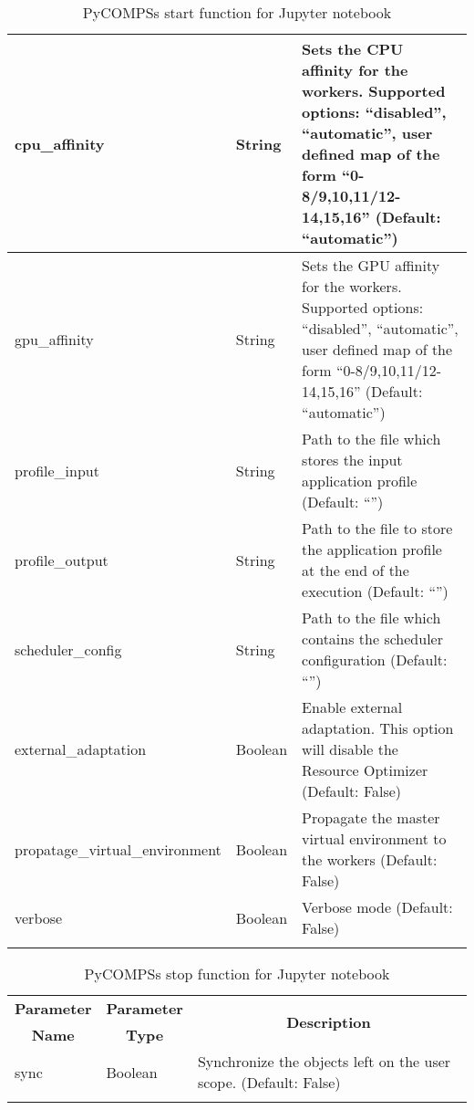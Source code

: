 \begin{longtable}{| p{} | p{} | p{} |}
    \hline
    cpu\_affinity  & String  & \footnotesize{Sets the CPU affinity for the workers. Supported options: ``disabled'', ``automatic'', user defined map of the form ``0-8/9,10,11/12-14,15,16'' (Default: ``automatic'')} \\ 
    \hline
    gpu\_affinity  & String  & \footnotesize{Sets the GPU affinity for the workers. Supported options: ``disabled'', ``automatic'', user defined map of the form ``0-8/9,10,11/12-14,15,16'' (Default: ``automatic'')} \\ 
    \hline
    profile\_input & String  & \footnotesize{Path to the file which stores the input application profile (Default: ``'')} \\ 
    \hline
    profile\_output   & String  & \footnotesize{Path to the file to store the application profile at the end of the execution (Default: ``'')} \\ 
    \hline
    scheduler\_\newline config & String & \footnotesize{Path to the file which contains the scheduler configuration (Default: ``'')} \\ 
    \hline
    external\_\newline adaptation & Boolean & \footnotesize{Enable external adaptation. This option will disable the Resource Optimizer (Default: False)} \\ 
    \hline
    propatage\_\newline virtual\_\newline environment & Boolean & \footnotesize{Propagate the master virtual environment to the workers (Default: False)} \\ 
    \hline
    verbose        & Boolean & \footnotesize{Verbose mode (Default: False)} \\ 
    \hline
    \caption{PyCOMPSs start function for Jupyter notebook}
    \label{tab:python_api_jupyter_start}
  \end{longtable}
\egroup

\bgroup
  \def\arraystretch{1.5}%
  \begin{longtable}{| p{} | p{} | p{} |}
    \hline
    \multicolumn{1}{|c|}{{\bf Parameter}} & \multicolumn{1}{c|}{{\bf Parameter}} & \multicolumn{1}{c|}{\multirow{2}{*}{{\bf Description}}}\\
    \multicolumn{1}{|c|}{{\bf Name}}      & \multicolumn{1}{c|}{{\bf Type}} & \\
    \hline
    sync           & Boolean & \footnotesize{Synchronize the objects left on the user scope. (Default: False)} \\
    \hline
    \caption{PyCOMPSs stop function for Jupyter notebook}
    \label{tab:python_api_jupyter_stop}
  \end{longtable}
\egroup

